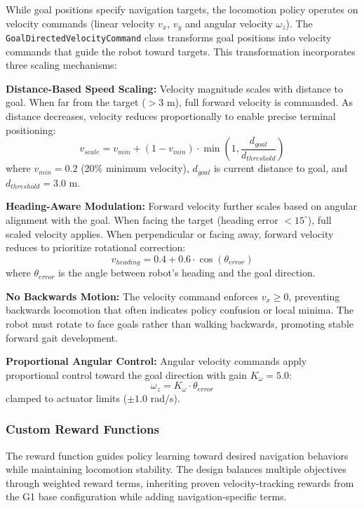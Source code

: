 \documentclass[12pt,a4paper]{article}
\begin{document}
While goal positions specify navigation targets, the locomotion policy operates on velocity commands (linear velocity $v_x$, $v_y$ and angular velocity $\omega_z$). The \texttt{GoalDirectedVelocityCommand} class transforms goal positions into velocity commands that guide the robot toward targets. This transformation incorporates three scaling mechanisms:

\textbf{Distance-Based Speed Scaling:} Velocity magnitude scales with distance to goal. When far from the target ($>3$ m), full forward velocity is commanded. As distance decreases, velocity reduces proportionally to enable precise terminal positioning:
\begin{equation}
v_{scale} = v_{min} + (1 - v_{min}) \cdot \min\left(1, \frac{d_{goal}}{d_{threshold}}\right)
\end{equation}
where $v_{min} = 0.2$ (20\% minimum velocity), $d_{goal}$ is current distance to goal, and $d_{threshold} = 3.0$ m.

\textbf{Heading-Aware Modulation:} Forward velocity further scales based on angular alignment with the goal. When facing the target (heading error $< 15^\circ
$), full scaled velocity applies. When perpendicular or facing away, forward velocity reduces to prioritize rotational correction:
\begin{equation}
v_{heading} = 0.4 + 0.6 \cdot \cos(\theta_{error})
\end{equation}
where $\theta_{error}$ is the angle between robot's heading and the goal direction.

\textbf{No Backwards Motion:} The velocity command enforces $v_x \geq 0$, preventing backwards locomotion that often indicates policy confusion or local minima. The robot must rotate to face goals rather than walking backwards, promoting stable forward gait development.

\textbf{Proportional Angular Control:} Angular velocity commands apply proportional control toward the goal direction with gain $K_\omega = 5.0$:
\begin{equation}
\omega_z = K_\omega \cdot \theta_{error}
\end{equation}
clamped to actuator limits ($\pm 1.0$ rad/s).

\subsubsection{Custom Reward Functions}

The reward function guides policy learning toward desired navigation behaviors while maintaining locomotion stability. The design balances multiple objectives through weighted reward terms, inheriting proven velocity-tracking rewards from the G1 base configuration while adding navigation-specific terms.
\end{document}
